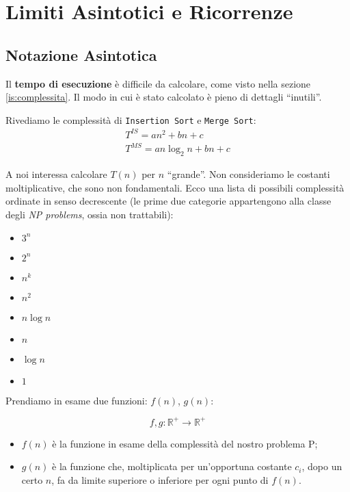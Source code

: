 \section{Limiti Asintotici e Ricorrenze}

\subsection{Notazione Asintotica}
Il \textbf{tempo di esecuzione} è difficile da calcolare, come visto nella sezione \ref{is:complessita}. 
Il modo in cui è stato calcolato è pieno di dettagli ``inutili''.\par
Rivediamo le complessità di \texttt{Insertion Sort} e \texttt{Merge Sort}:
\begin{gather*}
	T^{IS} = an^2 + bn + c \\
	T^{MS} = an \log_2 n + bn + c
\end{gather*}

A noi interessa calcolare $T(n)$ per $n$ ``grande''. Non consideriamo le costanti moltiplicative, che sono non fondamentali. Ecco una lista di possibili complessità ordinate in senso decrescente (le prime due categorie appartengono alla classe degli \emph{NP problems}, ossia non trattabili):

\begin{itemize}[noitemsep]
	\item $3^n$
	\item $2^n$
	\medskip
	\item $n^k$
	\item $n^2$
	\item $n \log n$
	\item $n$
	\item $\log n$
	\item $1$
\end{itemize}

Prendiamo in esame due funzioni: $f(n)$, $g(n)$:

\begin{displaymath}
f, g: \mathbb{R}^+ \rightarrow \mathbb{R}^+
\end{displaymath}

\begin{itemize}
	\item $f(n)$ è la funzione in esame della complessità del nostro problema P;
	\item $g(n)$ è la funzione che, moltiplicata per un'opportuna costante $c_i$, dopo un certo $n$, fa da 
	limite superiore o inferiore per ogni punto di $f(n)$.
\end{itemize}
\newpage
